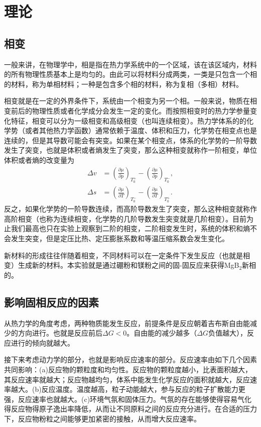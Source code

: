 \documentclass[font=default]{mpltx}
\begin{document}
\section{理论\cite{book}}
\subsection{相变}
一般来讲，在物理学中，相是指在热力学系统中的一个区域，该在该区域内，材料的所有物理性质基本上是均匀的。由此可以将材料分成两类，一类是只包含一个相的材料，称为单相材料；一种是包含多个相的材料，称为复相（多相）材料。

相变就是在一定的外界条件下，系统由一个相变为另一个相。一般来说，物质在相变前后的物理性质或者化学成分会发生一定的变化。而按照相变时的热力学参量变化特征，相变可以分为一级相变和高级相变（也叫连续相变）。热力学体系的的化学势（或者其他热力学函数）通常依赖于温度、体积和压力，化学势在相变点也是连续的，但是其导数可能会有突变。如果在某个相变点，体系的化学势的一阶导数发生了突变，也就是体积或者熵发生了突变，那么这种相变就称作一阶相变，单位体积或者熵的改变量为
\begin{equation}
  \begin{aligned}
    \Delta v&=\left(\frac{\partial\mu}{\partial p}\right)_{T_0^+}-\left(\frac{\partial\mu}{\partial p}\right)_{T_0^-},\\
    \Delta s&=\left(\frac{\partial\mu}{\partial T}\right)_{T_0^-}-\left(\frac{\partial\mu}{\partial T}\right)_{T_0^+}.
  \end{aligned}
\end{equation}
反之，如果化学势的一阶导数连续，而高阶导数发生了突变，那么这种相变就称作高阶相变（也称为连续相变，化学势的几阶导数发生突变就是几阶相变）。目前为止我们最高也只在实验上观察到二阶的相变，二阶相变发生时，系统的体积和熵不会发生突变，但是定压比热、定压膨胀系数和等温压缩系数会发生变化。

新材料的形成往往伴随着相变，不同材料可以在一定条件下发生反应（也就是相变）生成新的材料。本实验就是通过硼粉和镁粉之间的固-固反应来获得MgB$_2$新相的。
\subsection{影响固相反应的因素}
从热力学的角度考虑，两种物质能发生反应，前提条件是反应朝着吉布斯自由能减少的方向进行。也就是反应前后$\Delta G<0$。自由能的减少越多（$\Delta G$负值越大），反应进行的倾向就越大。

接下来考虑动力学的部分，也就是影响反应速率的部分。反应速率由如下几个因素共同影响：(a)反应物的颗粒度和均匀性。反应物的颗粒度越小，比表面积越大，其反应速率就越大；反应物越均匀，体系中能发生化学反应的面积就越大，反应速率越大。(b)反应温度。温度越高，粒子动能越大，参与反应的粒子扩散能力更强，反应速率也就越大。(c)环境气氛和固体压力。气氛的存在能够使得容易气化得反应物得原子逸出率降低，从而让不同原料之间的反应充分进行。在合适的压力下，反应物粉粒之间能够更加紧密的接触，从而增大反应速率。
\end{document}
